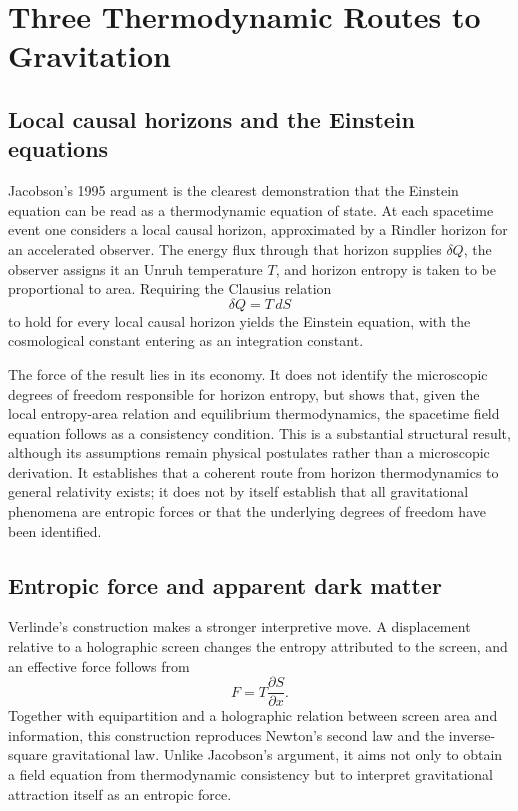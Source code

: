 \documentclass[11pt]{article}
\begin{document}
\section{Three Thermodynamic Routes to Gravitation}
\label{sec:landscape}

\subsection{Local causal horizons and the Einstein equations}
\label{subsec:jacobson}

Jacobson's 1995 argument is the clearest demonstration that the Einstein equation can be read as a thermodynamic equation of state. At each spacetime event one considers a local causal horizon, approximated by a Rindler horizon for an accelerated observer. The energy flux through that horizon supplies $\delta Q$, the observer assigns it an Unruh temperature $T$, and horizon entropy is taken to be proportional to area. Requiring the Clausius relation
\[
\delta Q = T\,dS
\]
to hold for every local causal horizon yields the Einstein equation, with the cosmological constant entering as an integration constant.

The force of the result lies in its economy. It does not identify the microscopic degrees of freedom responsible for horizon entropy, but shows that, given the local entropy-area relation and equilibrium thermodynamics, the spacetime field equation follows as a consistency condition. This is a substantial structural result, although its assumptions remain physical postulates rather than a microscopic derivation. It establishes that a coherent route from horizon thermodynamics to general relativity exists; it does not by itself establish that all gravitational phenomena are entropic forces or that the underlying degrees of freedom have been identified.

\subsection{Entropic force and apparent dark matter}
\label{subsec:verlinde}

Verlinde's construction makes a stronger interpretive move. A displacement relative to a holographic screen changes the entropy attributed to the screen, and an effective force follows from
\[
F = T\frac{\partial S}{\partial x}.
\]
Together with equipartition and a holographic relation between screen area and information, this construction reproduces Newton's second law and the inverse-square gravitational law. Unlike Jacobson's argument, it aims not only to obtain a field equation from thermodynamic consistency but to interpret gravitational attraction itself as an entropic force.
\end{document}
